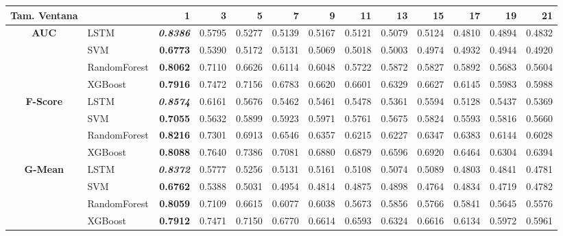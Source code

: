 \begin{table}[H]
	\centering
	\begin{adjustbox}{max width=14cm}
		\begin{tabular}{|c|l|r|r|r|r|r|r|r|r|r|r|r|}
			\hline
			\textbf{Tam. Ventana}&         &      1  &      3  &      5  &      7  &      9  &      11 &      13 &      15 &      17 &      19 &      21 \\
			\hline
			\textbf{AUC} &  LSTM & \textit{ \textbf{  0.8386 } } &  0.5795 &  0.5277 &  0.5139 &  0.5167 &  0.5121 &  0.5079 &  0.5124 &  0.4810 &  0.4894 &  0.4832 \\
			&  SVM & \textbf{  0.6773 } &  0.5390 &  0.5172 &  0.5131 &  0.5069 &  0.5018 &  0.5003 &  0.4974 &  0.4932 &  0.4944 &  0.4920 \\
			&  RandomForest & \textbf{  0.8062 } &  0.7110 &  0.6626 &  0.6114 &  0.6048 &  0.5722 &  0.5872 &  0.5827 &  0.5892 &  0.5683 &  0.5604 \\
			&  XGBoost & \textbf{  0.7916 } &  0.7472 &  0.7156 &  0.6783 &  0.6620 &  0.6601 &  0.6329 &  0.6627 &  0.6145 &  0.5983 &  0.5988 \\
			\hline
			\textbf{F-Score} &  LSTM & \textit{ \textbf{  0.8574 } } &  0.6161 &  0.5676 &  0.5462 &  0.5461 &  0.5478 &  0.5361 &  0.5594 &  0.5128 &  0.5437 &  0.5369 \\
			&  SVM & \textbf{  0.7055 } &  0.5632 &  0.5899 &  0.5923 &  0.5971 &  0.5761 &  0.5675 &  0.5824 &  0.5593 &  0.5816 &  0.5660 \\
			&  RandomForest & \textbf{  0.8216 } &  0.7301 &  0.6913 &  0.6546 &  0.6357 &  0.6215 &  0.6227 &  0.6347 &  0.6383 &  0.6144 &  0.6028 \\
			&  XGBoost & \textbf{  0.8088 } &  0.7640 &  0.7386 &  0.7081 &  0.6880 &  0.6879 &  0.6596 &  0.6920 &  0.6464 &  0.6304 &  0.6394 \\
			\hline
			\textbf{G-Mean} &  LSTM & \textit{ \textbf{  0.8372 } } &  0.5777 &  0.5256 &  0.5131 &  0.5161 &  0.5108 &  0.5074 &  0.5089 &  0.4803 &  0.4841 &  0.4781 \\
			&  SVM & \textbf{  0.6762 } &  0.5388 &  0.5031 &  0.4954 &  0.4814 &  0.4875 &  0.4898 &  0.4764 &  0.4834 &  0.4719 &  0.4782 \\
			&  RandomForest & \textbf{  0.8059 } &  0.7109 &  0.6615 &  0.6077 &  0.6038 &  0.5673 &  0.5856 &  0.5766 &  0.5841 &  0.5645 &  0.5576 \\
			&  XGBoost & \textbf{  0.7912 } &  0.7471 &  0.7150 &  0.6770 &  0.6614 &  0.6593 &  0.6324 &  0.6616 &  0.6134 &  0.5972 &  0.5961 \\

\end{tabular}
\end{adjustbox}
\end{table}

